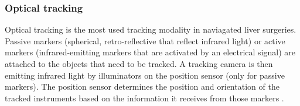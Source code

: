 \subsubsection{Optical tracking}
Optical tracking is the most used tracking modality in naviagated liver
surgeries. Passive markers (spherical, retro-reflective that reflect infrared
light) or active markers (infrared-emitting markers that are activated by an
electrical signal) \cite{wiles2004accuracy} are attached to the objects that
need to be tracked. A tracking camera is then emitting infrared light by illuminators
on the position sensor (only for passive markers). The position sensor
determines the position and orientation of the tracked instruments based on the
information it receives from those markers \cite{noauthor_polaris_nodate}.  
\endinput
